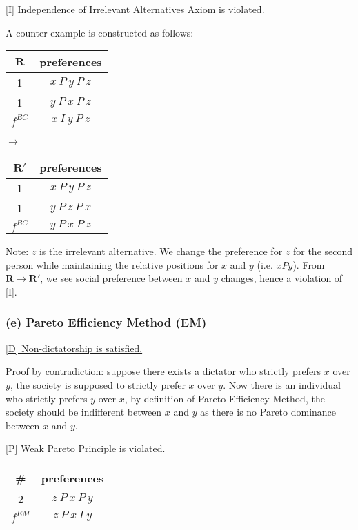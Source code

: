 \documentclass[a4paper]{article}
\begin{document}
\underline{[I] Independence of Irrelevant Alternatives Axiom is violated.}

A counter example is constructed as follows:

\begin{table}[!htbp]
    \centering
    \begin{tabular}{c|c|}
        $\mathbf{R}$ & preferences         \\ 
        \hline
        1  & $x\: P\: y\: P\: z$ \\
        1  & $y\: P\: x\: P\: z$ \\
        \hline 
        $f^{BC}$ & $x\: I\: y\: P\: z$
    \end{tabular}
    \qquad $\to$ \qquad
    \centering
    \begin{tabular}{c|c|}
        $\mathbf{R'}$ & preferences         \\ 
        \hline
        1  & $x\: P\: y\: P\: z$ \\
        1  & $y\: P\: z\: P\: x$ \\
        \hline 
        $f^{BC}$ & $y\: P\: x\: P\: z$
    \end{tabular}
\end{table}

Note: $z$ is the irrelevant alternative. We change the preference for $z$ for the second person while maintaining the relative positions for $x$ and $y$ (i.e. $xPy$). From $\mathbf{R}\to\mathbf{R'}$, we see social preference between $x$ and $y$ changes, hence a violation of [I].

\subsubsection*{(e) Pareto Efficiency Method (EM)}

\underline{[D] Non-dictatorship is satisfied.} 

Proof by contradiction: suppose there exists a dictator who strictly prefers $x$ over $y$, the society is supposed to strictly prefer $x$ over $y$. Now there is an individual who strictly prefers $y$ over $x$, by definition of Pareto Efficiency Method, the society should be indifferent between $x$ and $y$ as there is no Pareto dominance between $x$ and $y$.

\underline{[P] Weak Pareto Principle is violated.}

\begin{table}[!htbp]
    \centering
    \begin{tabular}{c|c|}
        \# & preferences         \\ 
        \hline
        2  & $z\: P\: x\: P\: y$ \\
        \hline
        $f^{EM}$ & $z\: P\: x\: I\: y$
    \end{tabular}
\end{table}
\end{document}
